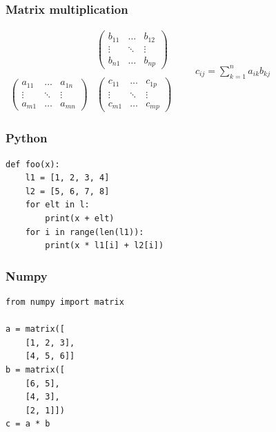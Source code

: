 \begin{frame}
  \frametitle{Matrix multiplication}
  $
  \begin{array}{cc}
    &
    \left(
      \begin{matrix}
        b_{11} & \ldots & b_{12} \\
        \vdots & \ddots & \vdots \\
        b_{n1} & \ldots & b_{np}
      \end{matrix}
    \right) \\
    &\\
    \left(
      \begin{matrix}
        a_{11} & \ldots & a_{1n} \\
        \vdots & \ddots & \vdots \\
        a_{m1} & \ldots & a_{mn}
      \end{matrix}
    \right) & \left(
      \begin{matrix}
        c_{11} & \ldots & c_{1p} \\
        \vdots & \ddots & \vdots \\
        c_{m1} & \ldots & c_{mp}
      \end{matrix}
    \right)
  \end{array}
  \qquad c_{ij} = \displaystyle\sum_{k=1}^n{a_{ik} b_{kj}}
  $
\end{frame}

\begin{frame}[fragile]
  \frametitle{Python}
  \begin{block}{}
    \begin{lstlisting}
def foo(x):
    l1 = [1, 2, 3, 4]
    l2 = [5, 6, 7, 8]
    for elt in l:
        print(x + elt)
    for i in range(len(l1)):
        print(x * l1[i] + l2[i])
    \end{lstlisting}
  \end{block}
\end{frame}

\begin{frame}[fragile]
  \frametitle{Numpy}
  \begin{block}{}
    \begin{lstlisting}
from numpy import matrix

a = matrix([
    [1, 2, 3],
    [4, 5, 6]]
b = matrix([
    [6, 5],
    [4, 3],
    [2, 1]])
c = a * b
    \end{lstlisting}
  \end{block}
\end{frame}

